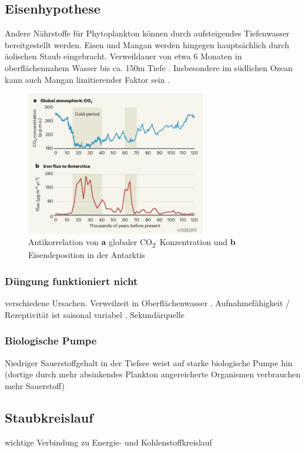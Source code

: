 \documentclass[12pt,a4paper,onecolumn]{scrartcl}
\newcommand{\cotwo}{CO\textsubscript{2}}
\begin{document}
\subsection{Eisenhypothese}
Andere Nährstoffe für Phytoplankton können durch aufsteigendes Tiefenwasser bereitgestellt werden. Eisen und Mangan werden hingegen hauptsächlich durch äolischen Staub eingebracht. Verweildauer von etwa 6 Monaten in oberflächennahem Wasser bis ca. 150m Tiefe  
\citep{Hayes.2015}. Insbesondere im südlichen Ozean kann auch Mangan limitierender Faktor sein \citep{Browning.2021}.
\begin{figure}[ht]
\centering
\includegraphics[width=0.7\textwidth]{bilder/Stoll2020/antarctic_iron_global_co2.png}
\caption{Antikorrelation von \textbf{a} globaler \cotwo \ Konzentration und \textbf{b} Eisendeposition in der Antarktis}
\end{figure}
\subsubsection{Düngung funktioniert nicht}
verschiedene Ursachen. Verweilzeit in Oberflächenwasser \citep{Hayes.2015}. Aufnahmefähigkeit / Rezeptivität ist saisonal variabel \citep{Gabric.2016}, Sekundärquelle
\subsubsection{Biologische Pumpe}
Niedriger Sauerstoffgehalt in der Tiefsee weist auf starke biologische Pumpe hin (dortige durch mehr absinkendes Plankton angereicherte Organismen verbrauchen mehr Sauerstoff)

\subsection{Staubkreislauf}
wichtige Verbindung zu Energie- und Kohlenstoffkreislauf \citep{Shao.2011}
\end{document}
